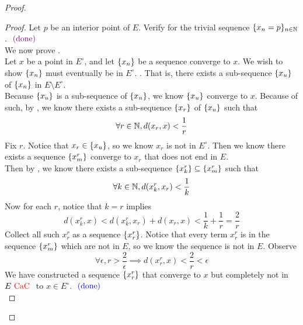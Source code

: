 \documentclass{report}
\begin{document}
\begin{proof}
\begin{proof}
Let $p$ be an interior point of $E$. Verify for the trivial sequence $\{ x_n=p \}_{n\in\mathbb{N}}$. $\textcolor{violet}{\text{ (done) }}$\\

We now prove .\\

Let $x$ be a point in $E^\circ $, and let $\{ x_n \}$ be a sequence converge to $x$. We wish to show  $\{ x_n \}$ must eventually be in $E^\circ $. . That is, there exists a sub-sequence $\{ x_u \}$ of $\{ x_n \}$ in $E\setminus E^\circ $.\\

Because $\{ x_u \}$ is a sub-sequence of $\{ x_n \}$, we know $\{ x_u \}$ converge to $x$. Because of such, by  , we know there exists a sub-sequence $\{ x_r \}$ of $\{ x_u \}$ such that
\begin{equation}
\forall r\in\mathbb{N}, d(x_r,x)<\frac{1}{r}
\end{equation}
Fix $r$. Notice that $x_r\in \{ x_u \}$, so we know $x_r$ is not in  $E^\circ $. Then we know there exists a sequence $\{ x^r_m \}$ converge to $x_r$ that does not end in $E$.\\

Then by , we know there exists a sub-sequence $\{ x^r_k \}\subseteq \{ x^r_m \}$ such that
\begin{equation}
\forall k\in\mathbb{N}, d(x^r_k,x_r)<\frac{1}{k}
\end{equation}
Now for each $r$, notice that  $k=r$ implies
\begin{equation}
d(x_k^r,x)<d(x^r_k,x_r)+d(x_r,x)<\frac{1}{k}+\frac{1}{r}=\frac{2}{r}
\end{equation}
Collect all such $x_r^r$ as a sequence  $\{ x_r^r \}$. Notice that every term $x_r^r$ is in the sequence $\{ x_m^r \}$ which are not in $E$, so we know the sequence is not in $E$. Observe
 \begin{equation}
\forall \epsilon, r>\frac{2}{\epsilon }\implies d(x_r^r,x)<\frac{2}{r}<\epsilon 
\end{equation}
We have constructed a sequence $\{ x_r^r \}$ that converge to $x$ but completely not in  $E\text{ \textcolor{red}{CaC} }$ to $x\in E^\circ $. $\textcolor{blue}{\text{ (done) }}$\\


\end{proof}
\end{proof}
\end{document}
